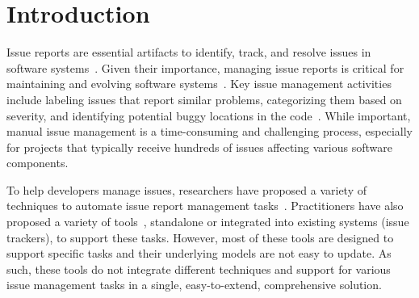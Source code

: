 
\section{Introduction}
\label{sec:intro}

Issue reports are essential artifacts to identify, track, and resolve issues in software systems~\cite{blImportance, detmisinginfoinbr, bettenburg2008makes,Saha:icse25}. Given their importance, managing issue reports is critical for maintaining and evolving software systems~\cite{benefitsofissuemanage, brAnalysis}. Key issue management activities include labeling issues that report similar problems, categorizing them based on severity, and identifying potential buggy locations in the code~\cite{dupbrharmful, otoom2019automated, blImportance}. While important, manual issue management is a time-consuming and challenging process, especially for projects that typically receive hundreds of issues affecting various software components.  

To help developers manage issues, researchers have proposed a variety of techniques to automate issue report management tasks~\cite{practitionerPerceiveAutomation}.  Practitioners have also proposed a variety of tools~\cite{find_duplicates,probot,rocha2015nextbug,priorityScheduler,pr-agent}, standalone or integrated into existing systems (\eg issue trackers), to support these tasks. However, most of these tools are designed to support specific tasks and their underlying models are not easy to update. As such, these tools do not integrate different techniques and support for various issue management tasks in a single, easy-to-extend, comprehensive solution.


